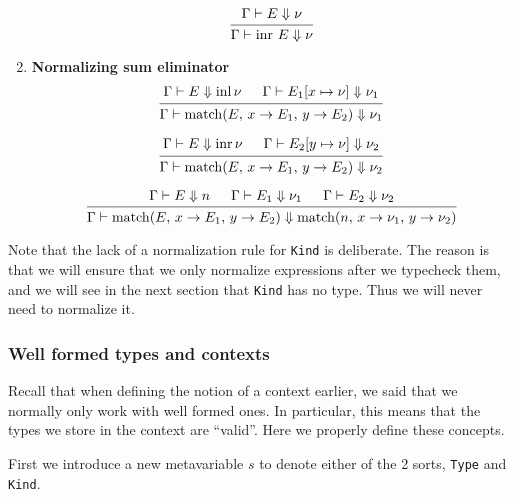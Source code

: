 \documentclass{article}
\begin{document}
\begin{enumerate}
  \[
    \begin{prooftree}
     \hypo{\Gamma \vdash E \Downarrow \nu}
     \infer1{\Gamma \vdash \inr \, E \Downarrow \nu}
    \end{prooftree}  
  \]

  \item \textbf{Normalizing sum eliminator}
  \[
    \begin{prooftree}
      \hypo{\Gamma \vdash E \Downarrow \inl \nu}
      \hypo{\Gamma \vdash E_1[x \mapsto \nu] \Downarrow \nu_1}
      \infer2{\Gamma \vdash 
        \match(E, \, x \rightarrow E_1, \, y \rightarrow E_2)
        \Downarrow \nu_1}
    \end{prooftree}  
  \]

  \[
   \begin{prooftree}
     \hypo{\Gamma \vdash E \Downarrow \inr \nu}
     \hypo{\Gamma \vdash E_2[y \mapsto \nu] \Downarrow \nu_2}
     \infer2{\Gamma \vdash 
       \match(E, \, x \rightarrow E_1, \, y \rightarrow E_2)
       \Downarrow \nu_2}
   \end{prooftree}  
  \]

  \[
   \begin{prooftree}
    \hypo{\Gamma \vdash E \Downarrow n}
      \hypo{\Gamma \vdash E_1 \Downarrow \nu_1}
      \hypo{\Gamma \vdash E_2 \Downarrow \nu_2}
      \infer3{\Gamma \vdash \match(E, \, x \rightarrow E_1, \, y \rightarrow E_2) 
               \Downarrow
               \match(n, \, x \rightarrow \nu_1, \, y \rightarrow \nu_2) 
               }
   \end{prooftree}  
  \]

\end{enumerate}

Note that the lack of a normalization rule for \verb|Kind| is deliberate.
The reason is that we will ensure that we only normalize expressions after we
typecheck them, and we will see in the next section that \verb|Kind| has no
type. Thus we will never need to normalize it.

\subsubsection{Well formed types and contexts}
Recall that when defining the notion of a context earlier, we said that we
normally only work with well formed ones. In particular, this means that the
types we store in the context are ``valid''. Here we properly define these
concepts.

First we introduce a new metavariable $s$ to denote either of the 2 sorts,
\verb|Type| and \verb|Kind|. 
\end{document}
